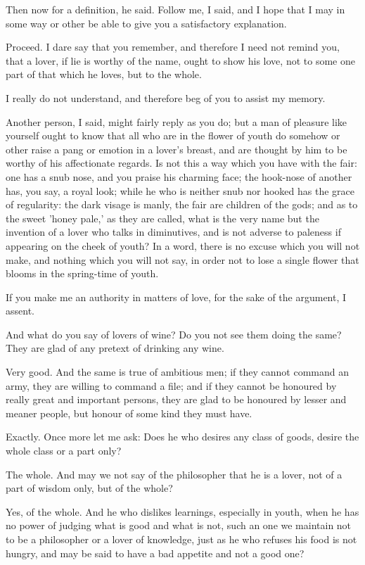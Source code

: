 Then now for a definition, he said.
Follow me, I said, and I hope that I may in some way or other be able to give you a satisfactory explanation.

Proceed.
I dare say that you remember, and therefore I need not remind you, that a lover, if lie is worthy of the name, ought to show his love, not to some one part of that which he loves, but to the whole.

I really do not understand, and therefore beg of you to assist my memory.

Another person, I said, might fairly reply as you do; but a man of pleasure like yourself ought to know that all who are in the flower of youth do somehow or other raise a pang or emotion in a lover's breast, and are thought by him to be worthy of his affectionate regards. Is not this a way which you have with the fair: one has a snub nose, and you praise his charming face; the hook-nose of another has, you say, a royal look; while he who is neither snub nor hooked has the grace of regularity: the dark visage is manly, the fair are children of the gods; and as to the sweet 'honey pale,' as they are called, what is the very name but the invention of a lover who talks in diminutives, and is not adverse to paleness if appearing on the cheek of youth? In a word, there is no excuse which you will not make, and nothing which you will not say, in order not to lose a single flower that blooms in the spring-time of youth.

If you make me an authority in matters of love, for the sake of the argument, I assent.

And what do you say of lovers of wine? Do you not see them doing the same? They are glad of any pretext of drinking any wine.

Very good.
And the same is true of ambitious men; if they cannot command an army, they are willing to command a file; and if they cannot be honoured by really great and important persons, they are glad to be honoured by lesser and meaner people, but honour of some kind they must have.

Exactly.
Once more let me ask: Does he who desires any class of goods, desire the whole class or a part only?

The whole.
And may we not say of the philosopher that he is a lover, not of a part of wisdom only, but of the whole?

Yes, of the whole.
And he who dislikes learnings, especially in youth, when he has no power of judging what is good and what is not, such an one we maintain not to be a philosopher or a lover of knowledge, just as he who refuses his food is not hungry, and may be said to have a bad appetite and not a good one?

